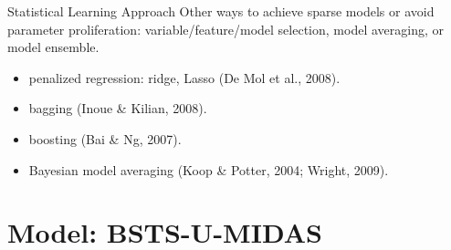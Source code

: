 \documentclass[14pt,xcolor=dvipsnames]{beamer}
\begin{document}
\begin{frame}{Statistical Learning Approach}
Other ways to achieve sparse models or avoid parameter proliferation: variable/feature/model selection, model averaging, or model ensemble. 
	\begin{itemize}%
		\item penalized regression: ridge, Lasso  (De Mol et al., 2008).
		\item bagging (Inoue \& Kilian, 2008).
		\item boosting (Bai \& Ng, 2007).
		\item Bayesian model averaging
		(Koop \& Potter, 2004; Wright, 2009).
	\end{itemize}	
	
\end{frame}






\section{Model:  BSTS-U-MIDAS}
\end{document}
